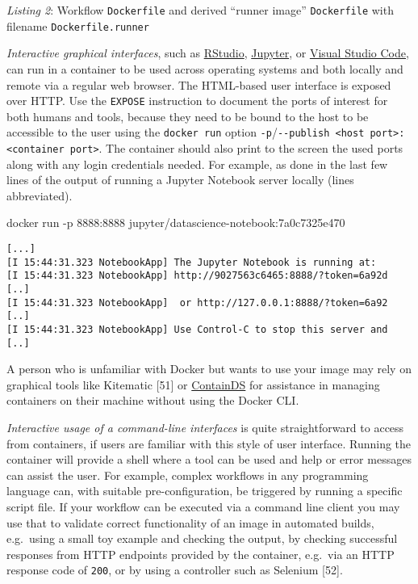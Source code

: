 \documentclass[10pt,letterpaper]{article}
\newenvironment{Shaded}{\begin{snugshade}}{\end{snugshade}}
\newcommand{\ExtensionTok}[1]{#1}
\newcommand{\NormalTok}[1]{#1}
\begin{document}
\normalsize

\emph{Listing 2}: Workflow \texttt{Dockerfile} and derived ``runner
image'' \texttt{Dockerfile} with filename \texttt{Dockerfile.runner}

\emph{Interactive graphical interfaces}, such as
\href{https://rstudio.com/products/rstudio/}{RStudio},
\href{https://jupyter.org/}{Jupyter}, or
\href{https://code.visualstudio.com/}{Visual Studio Code}, can run in a
container to be used across operating systems and both locally and
remote via a regular web browser. The HTML-based user interface is
exposed over HTTP. Use the \texttt{EXPOSE} instruction to document the
ports of interest for both humans and tools, because they need to be
bound to the host to be accessible to the user using the
\texttt{docker\ run} option
\texttt{-p}/\texttt{-\/-publish\ \textless{}host\ port\textgreater{}:\textless{}container\ port\textgreater{}}.
The container should also print to the screen the used ports along with
any login credentials needed. For example, as done in the last few lines
of the output of running a Jupyter Notebook server locally (lines
abbreviated).

\begin{Shaded}
\begin{Highlighting}[]
\ExtensionTok{docker}\NormalTok{ run -p 8888:8888 jupyter/datascience-notebook:7a0c7325e470}
\end{Highlighting}
\end{Shaded}

\begin{verbatim}
[...]
[I 15:44:31.323 NotebookApp] The Jupyter Notebook is running at:
[I 15:44:31.323 NotebookApp] http://9027563c6465:8888/?token=6a92d [..]
[I 15:44:31.323 NotebookApp]  or http://127.0.0.1:8888/?token=6a92 [..]
[I 15:44:31.323 NotebookApp] Use Control-C to stop this server and [..]
\end{verbatim}

A person who is unfamiliar with Docker but wants to use your image may
rely on graphical tools like Kitematic {[}51{]} or
\href{https://containds.com/}{ContainDS} for assistance in managing
containers on their machine without using the Docker CLI.

\emph{Interactive usage of a command-line interfaces} is quite
straightforward to access from containers, if users are familiar with
this style of user interface. Running the container will provide a shell
where a tool can be used and help or error messages can assist the user.
For example, complex workflows in any programming language can, with
suitable pre-configuration, be triggered by running a specific script
file. If your workflow can be executed via a command line client you may
use that to validate correct functionality of an image in automated
builds, e.g.~using a small toy example and checking the output, by
checking successful responses from HTTP endpoints provided by the
container, e.g.~via an HTTP response code of \texttt{200}, or by using a
controller such as Selenium {[}52{]}.
\end{document}

